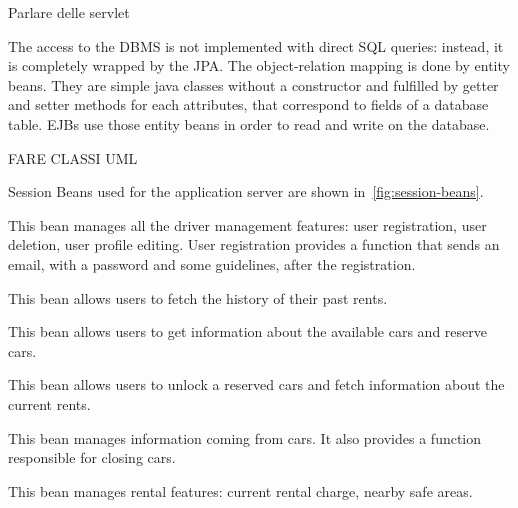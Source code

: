 Parlare delle servlet

The access to the DBMS is not implemented with direct SQL queries: instead, it is completely wrapped by the JPA. The object-relation mapping is done by entity beans. They are simple java classes without a constructor and fulfilled by getter and setter methods for each attributes, that correspond to fields of a database table. EJBs use those entity beans in order to read and write on the database.

FARE CLASSI UML

Session Beans used for the application server are shown in~\autoref{fig:session-beans}.

This bean manages all the driver management features: user registration, user deletion, user profile editing.
User registration provides a function that sends an email, with a password and some guidelines, after the registration.

This bean allows users to fetch the history of their past rents.

This bean allows users to get information about the available cars and reserve cars.

This bean allows users to unlock a reserved cars and fetch information about the current rents.

This bean manages information coming from cars. It also provides a function responsible for closing cars.

This bean manages rental features: current rental charge, nearby safe areas.

